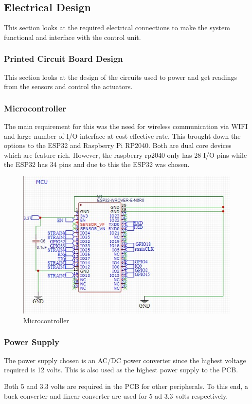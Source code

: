 \subsection{Electrical Design}
This section looks at the required electrical connections to make the system functional and interface with the control unit.
\subsubsection{Printed Circuit Board Design}
This section looks at the design of the circuits used to power and get readings from the sensors and control the actuators.

\subsubsection{Microcontroller}
The main requirement for this was the need for wireless communication via WIFI and large number of I/O interface
 at cost effective rate. This brought down the options to the ESP32 and Raspberry Pi RP2040. Both are dual core devices
  which are feature rich. However, the raspberry rp2040 only has 28 I/O pins while the ESP32 has 34 pins and due to this
   the ESP32 was chosen.
\begin{center}
	\begin{figure}[H]
		\centering
		\includegraphics[width=0.7\linewidth]{Figures/mcu}
		\caption[Microcontroller]{Microcontroller}
	\end{figure}
\end{center}
\subsubsection{Power Supply}
The power supply chosen is an AC/DC power converter since the highest voltage required is 12 volts. This is also used as the highest power supply to the PCB.

Both 5 and 3.3 volts are required in the PCB for other peripherals. To this end, a buck converter and linear converter are used for 5 ad 3.3 volts respectively.

